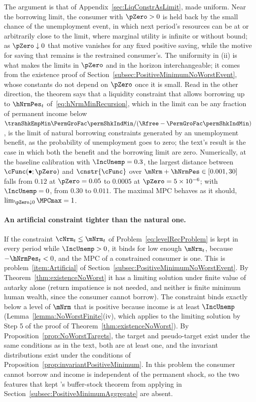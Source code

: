 \documentclass[\econtexRoot/BufferStockTheory]{subfiles}
\begin{document}
The argument is that of Appendix~\ref{sec:LiqConstrAsLimit}, made uniform.
Near the borrowing limit, the consumer with $\pZero>0$ is held back by the small chance of the unemployment event, in which next period's resources can be at or arbitrarily close to the limit, where marginal utility is infinite or without bound; as $\pZero\downarrow 0$ that motive vanishes for any fixed positive saving, while the motive for saving that remains is the restrained consumer's.
The uniformity in (ii) is what makes the limits in $\pZero$ and in the horizon interchangeable; it comes from the existence proof of Section~\ref{subsec:PositiveMinimumNoWorstEvent}, whose constants do not depend on $\pZero$ once it is small.
Read in the other direction, the theorem says that a liquidity constraint that allows borrowing up to $\hNrmPes_{t}$ of~\eqref{eq:hNrmMinRecursion}, which in the limit can be any fraction of permanent income below $\tranShkEmpMin\PermGroFac\permShkIndMin/(\Rfree-\PermGroFac\permShkIndMin)$, is the limit of natural borrowing constraints generated by an unemployment benefit, as the probability of unemployment goes to zero; the text's result is the case in which both the benefit and the borrowing limit are zero.
Numerically, at the baseline calibration with $\IncUnemp=0.3$, the largest distance between $\cFunc(\bullet;\pZero)$ and $\cnstr{\cFunc}$ over $\mNrm+\hNrmPes\in[0.001,30]$ falls from $0.12$ at $\pZero=0.05$ to $0.0005$ at $\pZero=5\times 10^{-6}$; with $\IncUnemp=0$, from $0.30$ to $0.011$.
The maximal MPC behaves as it should, $\lim_{\pZero\downarrow 0}\MPCmax=1$.

\paragraph{An artificial constraint tighter than the natural one.}
If the constraint $\cNrm_{t}\leq\mNrm_{t}$ of Problem~\eqref{eq:levelRecProblem} is kept in every period while $\IncUnemp>0$, it binds for low enough $\mNrm_{t}$, because $-\hNrmPes_{t}<0$, and the MPC of a constrained consumer is one.
This is problem~\ref{item:Artificial} of Section~\ref{subsec:PositiveMinimumNoWorstEvent}.
By Theorem~\ref{thm:existenceNoWorst} it has a limiting solution under finite value of autarky alone (return impatience is not needed, and neither is finite minimum human wealth, since the consumer cannot borrow).
The constraint binds exactly below a level of $\mNrm$ that is positive because income is at least $\IncUnemp$ (Lemma~\ref{lemma:NoWorstFinite}(iv), which applies to the limiting solution by Step 5 of the proof of Theorem~\ref{thm:existenceNoWorst}).
By Proposition~\ref{prop:NoWorstTargets}, the target and pseudo-target exist under the same conditions as in the text, both are at least one, and the invariant distributions exist under the conditions of Proposition~\ref{prop:invariantPositiveMinimum}.
In this problem the consumer cannot borrow and income is independent of the permanent shock, so the two features that kept \cite{szeidlInvariant}'s buffer-stock theorem from applying in Section~\ref{subsec:PositiveMinimumAggregate} are absent.
\end{document}
